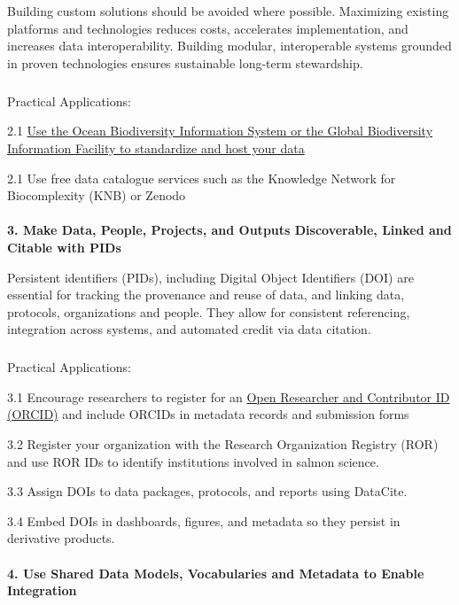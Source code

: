 \documentclass[
  letterpaper,
  DIV=11,
  numbers=noendperiod]{scrartcl}
\makeatletter
\let\oldparagraph\paragraph
\renewcommand{\paragraph}{
    \@ifstar
      \xxxParagraphStar
      \xxxParagraphNoStar
  }
\newcommand{\xxxParagraphStar}[1]{\oldparagraph*{#1}\mbox{}}
\newcommand{\xxxParagraphNoStar}[1]{\oldparagraph{#1}\mbox{}}
\let\oldsubparagraph\subparagraph
\renewcommand{\subparagraph}{
    \@ifstar
      \xxxSubParagraphStar
      \xxxSubParagraphNoStar
  }
\newcommand{\xxxSubParagraphStar}[1]{\oldsubparagraph*{#1}\mbox{}}
\newcommand{\xxxSubParagraphNoStar}[1]{\oldsubparagraph{#1}\mbox{}}
\makeatother
\begin{document}
Building custom solutions should be avoided where possible. Maximizing
existing platforms and technologies reduces costs, accelerates
implementation, and increases data interoperability. Building modular,
interoperable systems grounded in proven technologies ensures
sustainable long-term stewardship.

\subparagraph{Practical Applications:}\label{practical-applications-1}

2.1 \href{https://doi.org/10.14286/duc6mu}{Use the Ocean Biodiversity
Information System or the Global Biodiversity Information Facility to
standardize and host your data}

2.1 Use free data catalogue services such as the Knowledge Network for
Biocomplexity (KNB) or Zenodo

\paragraph{\texorpdfstring{\textbf{3. Make Data, People, Projects, and
Outputs Discoverable, Linked and Citable with
PIDs}}{3. Make Data, People, Projects, and Outputs Discoverable, Linked and Citable with PIDs}}\label{make-data-people-projects-and-outputs-discoverable-linked-and-citable-with-pids}

Persistent identifiers (PIDs), including Digital Object Identifiers
(DOI) are essential for tracking the provenance and reuse of data, and
linking data, protocols, organizations and people. They allow for
consistent referencing, integration across systems, and automated credit
via data citation.

\subparagraph{Practical Applications:}\label{practical-applications-2}

3.1 Encourage researchers to register for an
\href{https://orcid.org/}{Open Researcher and Contributor ID (ORCID)}
and include ORCIDs in metadata records and submission forms

3.2 Register your organization with the Research Organization Registry
(ROR) and use ROR IDs to identify institutions involved in salmon
science.

3.3 Assign DOIs to data packages, protocols, and reports using DataCite.

3.4 Embed DOIs in dashboards, figures, and metadata so they persist in
derivative products.

\paragraph{\texorpdfstring{\textbf{4. Use Shared Data Models,
Vocabularies and Metadata to Enable
Integration}}{4. Use Shared Data Models, Vocabularies and Metadata to Enable Integration}}\label{use-shared-data-models-vocabularies-and-metadata-to-enable-integration}
\end{document}
